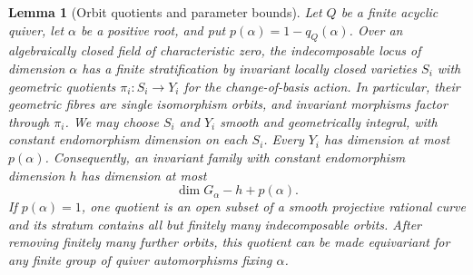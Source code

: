 \documentclass[11pt, reqno]{amsart}
\numberwithin{equation}{section}
\newtheorem{lemma}[theorem]{Lemma}
\theoremstyle{definition}
\theoremstyle{remark}
\begin{document}
\begin{lemma}[Orbit quotients and parameter bounds]
\label{lem:orbit-parameter-bound}
Let $Q$ be a finite acyclic quiver, let $\alpha$ be a positive root,
and put $p(\alpha)=1-q_Q(\alpha)$. Over an algebraically closed field
of characteristic zero, the indecomposable locus of dimension $\alpha$
has a finite stratification by invariant locally closed varieties
$S_i$ with \emph{geometric quotients} $\pi_i:S_i\to Y_i$ for the
change-of-basis action. In particular, their geometric fibres are single
isomorphism orbits, and invariant morphisms factor through $\pi_i$. We may choose $S_i$ and $Y_i$
smooth and geometrically integral, with constant endomorphism dimension
on each $S_i$. Every $Y_i$ has dimension at most $p(\alpha)$.
Consequently, an invariant family with constant endomorphism dimension
$h$ has dimension at most
\[ \dim G_\alpha-h+p(\alpha). \]
If $p(\alpha)=1$, one quotient is an open subset of a smooth projective
rational curve and its stratum contains all but finitely many
indecomposable orbits. After removing finitely many further orbits,
this quotient can be made equivariant for any finite group of quiver
automorphisms fixing $\alpha$.
\end{lemma}
\end{document}
